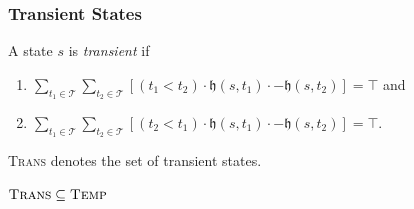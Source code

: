 \subsubsection{Transient States}

\begin{defn}
	A state $s$ is \textit{transient} if
	\begin{enumerate}
		\item $\displaystyle \sum_{t_1 \in \mathcal{T}} \sum_{t_2 \in \mathcal{T}} [(t_1 < t_2) \cdot \mathfrak{h}(s, t_1) \cdot - \mathfrak{h}(s, t_2)] = \top$ and
		\item $\displaystyle \sum_{t_1 \in \mathcal{T}} \sum_{t_2 \in \mathcal{T}} [(t_2 < t_1) \cdot \mathfrak{h}(s, t_1) \cdot - \mathfrak{h}(s, t_2)] = \top$.
	\end{enumerate}
\end{defn}

\textsc{Trans} denotes the set of transient states.


$\textsc{Trans} \subseteq \textsc{Temp}$



